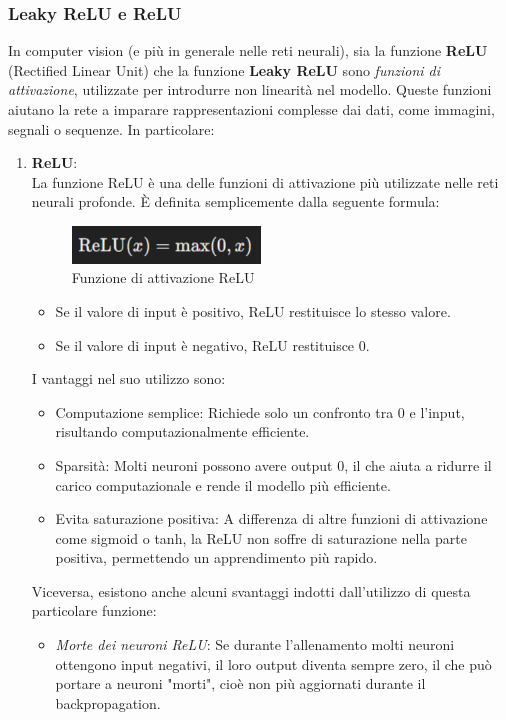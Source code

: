 \documentclass[12pt,a4paper,openright,twoside]{book}
\begin{document}
\subsubsection{Leaky ReLU e ReLU}
In computer vision (e più in generale nelle reti neurali), sia la funzione \textbf{ReLU} (Rectified Linear Unit) che la funzione \textbf{Leaky ReLU} sono {\itshape funzioni di attivazione}, utilizzate per introdurre non linearità nel modello. Queste funzioni aiutano la rete a imparare rappresentazioni complesse dai dati, come immagini, segnali o sequenze. In particolare:
\begin{enumerate}
\item \textbf{ReLU}:\\
La funzione ReLU è una delle funzioni di attivazione più utilizzate nelle reti neurali profonde. È definita semplicemente dalla seguente formula:

\begin{figure}[H]
  	\centering
   	\includegraphics[height=1cm, width=5cm]{figures/relu.pdf}
    	\caption{Funzione di attivazione ReLU}
	\label{fig:relu}
\end{figure}

\begin{itemize}
\item Se il valore di input è positivo, ReLU restituisce lo stesso valore.
\item Se il valore di input è negativo, ReLU restituisce 0.
\end{itemize}

I vantaggi nel suo utilizzo sono:
\begin{itemize}
\item Computazione semplice: Richiede solo un confronto tra 0 e l'input, risultando computazionalmente efficiente.
\item Sparsità: Molti neuroni possono avere output 0, il che aiuta a ridurre il carico computazionale e rende il modello più efficiente.
\item Evita saturazione positiva: A differenza di altre funzioni di attivazione come sigmoid o tanh, la ReLU non soffre di saturazione nella parte positiva, permettendo un apprendimento più rapido.
\end{itemize}
Viceversa, esistono anche alcuni svantaggi indotti dall'utilizzo di questa particolare funzione:
\begin{itemize}
\item {\itshape Morte dei neuroni ReLU}: Se durante l'allenamento molti neuroni ottengono input negativi, il loro output diventa sempre zero, il che può portare a neuroni "morti", cioè non più aggiornati durante il backpropagation.
\end{itemize}


\end{enumerate}
\end{document}
